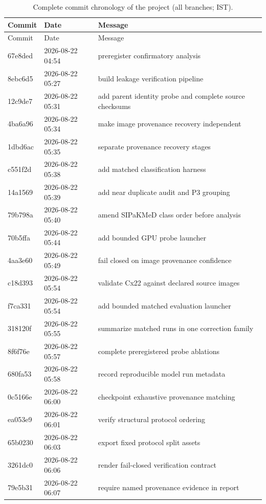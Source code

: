 {\scriptsize
\setlength{\tabcolsep}{3.5pt}
\begin{longtable}{llp{11.2cm}}
\caption{Complete commit chronology of the project (all branches; IST).}\label{r:tab:git}\\
\toprule
Commit & Date & Message \\
\midrule
\endfirsthead
\toprule
Commit & Date & Message \\
\midrule
\endhead
\bottomrule
\endfoot
67e8ded & 2026-08-22 04:54 & preregister confirmatory analysis \\
8ebc6d5 & 2026-08-22 05:27 & build leakage verification pipeline \\
12c9de7 & 2026-08-22 05:31 & add parent identity probe and complete source checksums \\
4ba6a96 & 2026-08-22 05:34 & make image provenance recovery independent \\
1dbd6ac & 2026-08-22 05:35 & separate provenance recovery stages \\
c551f2d & 2026-08-22 05:38 & add matched classification harness \\
14a1569 & 2026-08-22 05:39 & add near duplicate audit and P3 grouping \\
79b798a & 2026-08-22 05:40 & amend SIPaKMeD class order before analysis \\
70b5ffa & 2026-08-22 05:44 & add bounded GPU probe launcher \\
4aa3e60 & 2026-08-22 05:49 & fail closed on image provenance confidence \\
c18d393 & 2026-08-22 05:54 & validate Cx22 against declared source images \\
f7ca331 & 2026-08-22 05:54 & add bounded matched evaluation launcher \\
318120f & 2026-08-22 05:55 & summarize matched runs in one correction family \\
8f6f76e & 2026-08-22 05:57 & complete preregistered probe ablations \\
680fa53 & 2026-08-22 05:58 & record reproducible model run metadata \\
0c5166e & 2026-08-22 06:00 & checkpoint exhaustive provenance matching \\
ea053e9 & 2026-08-22 06:01 & verify structural protocol ordering \\
65b0230 & 2026-08-22 06:03 & export fixed protocol split assets \\
3261dc0 & 2026-08-22 06:06 & render fail-closed verification contract \\
79e5b31 & 2026-08-22 06:07 & require named provenance evidence in report \\

\end{longtable}}
